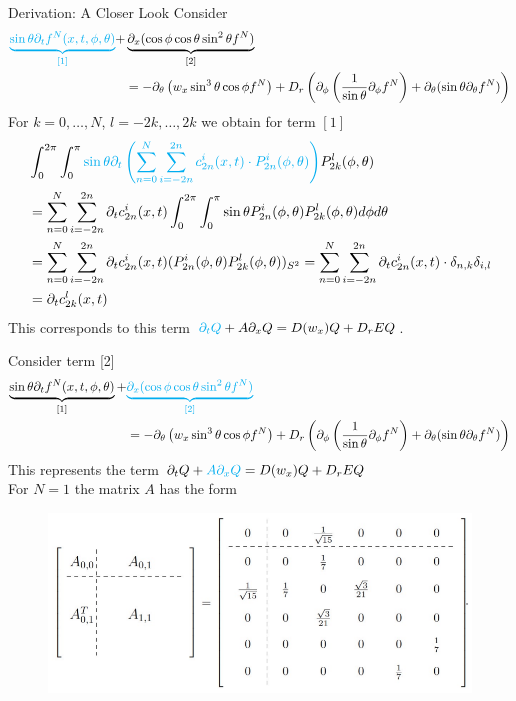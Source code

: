 \begin{frame}{Derivation: A Closer Look}
\scriptsize
Consider 
\begin{align*}
	\textcolor{cyan}{\underbrace{\sin\theta \partial_{t}f^N(x,t,\phi,\theta)}_{[1]}} + &  \underbrace{\partial_x (\cos\phi \cos\theta \sin^2\theta f^N)}_{[2]} \\
	& 
	= -\partial_\theta \left(w_x \sin^3 \theta \cos \phi f^N\right) + D_{r} \left(\partial_\phi \left(\frac{1}{\sin \theta} \partial_\phi f^N \right) + \partial_\theta (\sin \theta \partial_\theta f^N) \right)
\end{align*}
\pause
For $k=0, \ldots, N$, $l=-2k, \ldots, 2k$ we obtain for term $[1]$
\begin{align*}
	&\int_{0}^{2\pi} \int_{0}^{\pi} \textcolor{cyan}{\sin\theta \partial_t \left(\sum_{n=0}^{N} \sum_{i=-2n}^{2n} c^i_{2n}(x,t) \cdot P^i_{2n}(\phi, \theta)\right)}P^l_{2k}(\phi, \theta) \\
	&= \sum_{n=0}^{N} \sum_{i=-2n}^{2n} \partial_t c^i_{2n}(x,t) \int_{0}^{2\pi} \int_{0}^{\pi} \sin\theta P^i_{2n}(\phi, \theta) P^l_{2k}(\phi, \theta) d\phi d\theta \\
	&=  \sum_{n=0}^{N} \sum_{i=-2n}^{2n} \partial_t c^i_{2n}(x,t) (P^i_{2n}(\phi, \theta) P^l_{2k}(\phi, \theta))_{S^2} =  \sum_{n=0}^{N} \sum_{i=-2n}^{2n} \partial_t c^i_{2n}(x,t) \cdot \delta_{n,k} \delta_{i,l} \\
	&= \partial_t c^l_{2k}(x,t)
\end{align*}
\pause
This corresponds to this term
$\textcolor{cyan}{\partial_t Q} + A\partial_x Q = D(w_x)Q+ D_rE Q$.
\end{frame}

\begin{frame}
	\scriptsize
Consider term [2]
\begin{align*}
	\underbrace{\sin\theta \partial_{t}f^N(x,t,\phi,\theta)}_{[1]} + &  \textcolor{cyan}{\underbrace{\partial_x (\cos\phi \cos\theta \sin^2\theta f^N)}_{[2]}} \\
	& 
	= -\partial_\theta \left(w_x \sin^3 \theta \cos \phi f^N\right) + D_{r} \left(\partial_\phi \left(\frac{1}{\sin \theta} \partial_\phi f^N \right) + \partial_\theta (\sin \theta \partial_\theta f^N) \right)
\end{align*}
\pause
This represents the term
$\partial_t Q + \textcolor{cyan}{A\partial_x Q} =  D(w_x)Q+ D_rEQ$ \\
\vspace{2mm}
For $N=1$ the matrix $A$ has the form
\begin{figure}[H]
		\includegraphics[scale=0.5]{Bilder/MatrixA}
\end{figure}
\end{frame}


